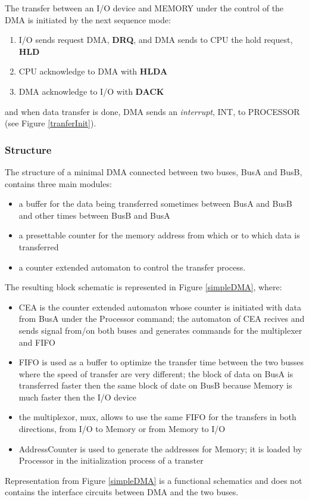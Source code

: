 
The transfer between an I/O device and MEMORY under the control of the DMA is initiated by the next sequence mode:
\begin{enumerate}
    \item I/O sends request DMA, {\bf DRQ}, and DMA sends to CPU the hold request, {\bf HLD}
    \item CPU acknowledge to DMA with {\bf HLDA}
    \item DMA acknowledge to I/O with {\bf DACK}
\end{enumerate}
and when data transfer is done,  DMA sends an {\em interrupt}, INT, to PROCESSOR (see Figure \ref{tranferInit}).


\subsubsection{Structure}

The structure of a minimal DMA connected between two buses, BusA and BusB, contains three main modules:
\begin{itemize}
        \item a buffer for the data being transferred sometimes between BusA and  BusB and other times between BusB and  BusA
        \item a presettable counter for the memory address from which or to which data is transferred
        \item a counter extended automaton to control the transfer process.
\end{itemize}
The resulting block schematic is represented in Figure \ref{simpleDMA}, where:


\begin{itemize}
    \item CEA is the counter extended automaton whose counter is initiated with data from BusA under the Processor command; the automaton of CEA recives and sends signal from/on both buses and generates commands for the multiplexer and FIFO
    \item FIFO is used as a buffer to optimize the transfer time between the two busses where the speed of transfer are very different; the block of data on BusA is transferred faster then the same block of date on BusB because Memory is much faster then the I/O device
    \item the multiplexor, mux, allows to use the same FIFO for the transfers in both directions, from I/O to Memory or from Memory to I/O
    \item AddressCounter is used to generate the addresses for Memory; it is loaded by Processor in the initialization process of a transter
\end{itemize}
Representation from Figure \ref{simpleDMA} is a functional schematics and does not contains the interface circuits between DMA and the two buses.

